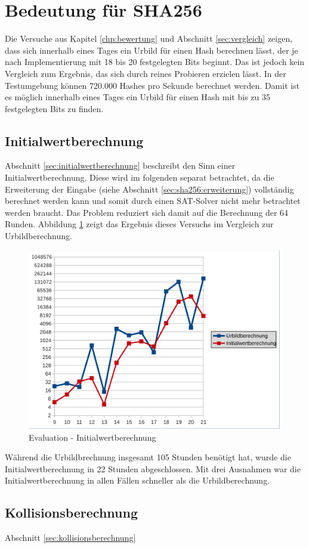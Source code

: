 \section{Bedeutung für SHA256}

Die Versuche aus Kapitel \ref{chp:bewertung} und Abschnitt \ref{sec:vergleich} zeigen, dass sich innerhalb eines Tages
ein Urbild für einen Hash berechnen lässt, der je nach Implementierung mit 18 bis 20 festgelegten Bits beginnt. Das ist jedoch
kein Vergleich zum Ergebnis, das sich durch reines Probieren erzielen lässt. In der Testumgebung können 720.000 Hashes pro Sekunde
berechnet werden. Damit ist es möglich innerhalb eines Tages ein Urbild für einen Hash mit bis zu 35 festgelegten Bits zu finden.

\subsection{Initialwertberechnung}
Abschnitt \ref{sec:initialwertberechnung} beschreibt den Sinn einer Initialwertberechnung. Diese wird im folgenden separat
betrachtet, da die Erweiterung der Eingabe (siehe Abschnitt \ref{sec:sha256:erweiterung}) vollständig berechnet werden kann
und somit durch einen SAT-Solver nicht mehr betrachtet werden braucht. Das Problem reduziert sich damit auf die Berechnung
der 64 Runden. Abbildung \ref{fig:eval_initial} zeigt das Ergebnis dieses Versuchs im Vergleich zur Urbildberechnung.
\begin{figure}[!h]
  \centering
  \includegraphics[scale=0.55]{images/eval_initial}
  \caption{Evaluation - Initialwertberechnung}
  \label{fig:eval_initial}
\end{figure}

Während die Urbildbrechnung insgesamt 105 Stunden benötigt hat, wurde die Initialwertberechnung in 22 Stunden
abgeschlossen. Mit drei Ausnahmen war die Initialwertberechnung in allen Fällen schneller als die Urbildberechnung.

\subsection{Kollisionsberechnung}

Abschnitt \ref{sec:kollisionsberechnung}